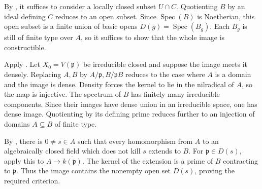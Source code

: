 By , it suffices to consider a locally closed subset $U\cap C$. Quotienting $B$ by an ideal defining $C$ reduces to an open subset. Since $\operatorname{Spec}(B)$ is Noetherian, this open subset is a finite union of basic opens $D(g)=\operatorname{Spec}(B_g)$. Each $B_g$ is still of finite type over $A$, so it suffices to show that the whole image is constructible.

Apply . Let $X_0=V(\mathfrak{p})$ be irreducible closed and suppose the image meets it densely. Replacing $A,B$ by $A/\mathfrak{p},B/\mathfrak{p}B$ reduces to the case where $A$ is a domain and the image is dense. Density forces the kernel to lie in the nilradical of $A$, so the map is injective. The spectrum of $B$ has finitely many irreducible components. Since their images have dense union in an irreducible space, one has dense image. Quotienting by its defining prime reduces further to an injection of domains $A\subseteq B$ of finite type.

By , there is $0\ne s\in A$ such that every homomorphism from $A$ to an algebraically closed field which does not kill $s$ extends to $B$. For $\mathfrak{p}\in D(s)$, apply this to $A\to\overline{k(\mathfrak{p})}$. The kernel of the extension is a prime of $B$ contracting to $\mathfrak{p}$. Thus the image contains the nonempty open set $D(s)$, proving the required criterion.
